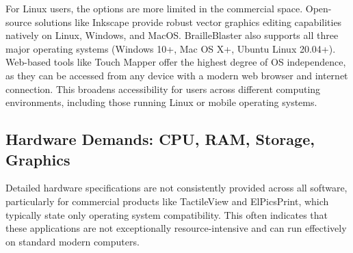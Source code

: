 For Linux users, the options are more limited in the commercial space. Open-source solutions like Inkscape provide robust vector graphics editing capabilities natively on Linux, Windows, and MacOS. \cite{BlindHelpDBT} BrailleBlaster also supports all three major operating systems (Windows 10+, Mac OS X+, Ubuntu Linux 20.04+). \cite{SterlingAdaptivesVP} Web-based tools like Touch Mapper offer the highest degree of OS independence, as they can be accessed from any device with a modern web browser and internet connection. \cite{AELData,NYUWorkflow,Ability2AccessTSS} This broadens accessibility for users across different computing environments, including those running Linux or mobile operating systems.

\subsection{Hardware Demands: CPU, RAM, Storage, Graphics}

\vspace{1em}

Detailed hardware specifications are not consistently provided across all software, particularly for commercial products like TactileView and ElPicsPrint, which typically state only operating system compatibility. This often indicates that these applications are not exceptionally resource-intensive and can run effectively on standard modern computers.

